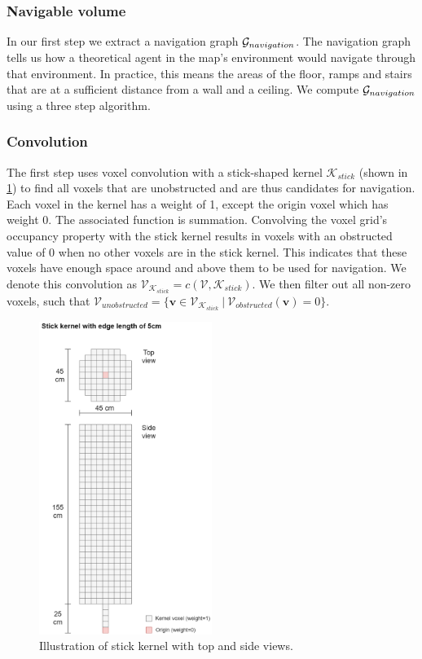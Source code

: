 \subsubsection{Navigable volume}
In our first step we extract a navigation graph \(\mathcal{G}_{navigation}\). The navigation graph tells us how a theoretical agent in the map's environment would navigate through that environment. In practice, this means the areas of the floor, ramps and stairs that are at a sufficient distance from a wall and a ceiling. We compute \(\mathcal{G}_{navigation}\) using a three step algorithm.

\subsubsection{Convolution}
The first step uses voxel convolution with a stick-shaped kernel \(\mathcal{K}_{stick}\) (shown in \ref{fig:stick_kernel}) to find all voxels that are unobstructed and are thus candidates for navigation. Each voxel in the kernel has a weight of 1, except the origin voxel which has weight 0. The associated function is summation. Convolving the voxel grid's occupancy property with the stick kernel results in voxels with an obstructed value of 0 when no other voxels are in the stick kernel. This indicates that these voxels have enough space around and above them to be used for navigation. We denote this convolution as \(\mathcal{V}_{\mathcal{K}_{stick}} = c(\mathcal{V},\mathcal{K}_{stick})\). We then filter out all non-zero voxels, such that \(\mathcal{V}_{unobstructed}=\{\boldsymbol{v} \in \mathcal{V}_{\mathcal{K}_{stick}}\ |\ \mathcal{V}_{obstructed}(\boldsymbol{v}) = 0\}\). 

\begin{figure}[h]
    \centering
    \includegraphics*[width=0.5\textwidth]{./fig/structuring_element.png}
    \caption{Illustration of stick kernel with top and side views.}
    \label{fig:stick_kernel}
\end{figure}

